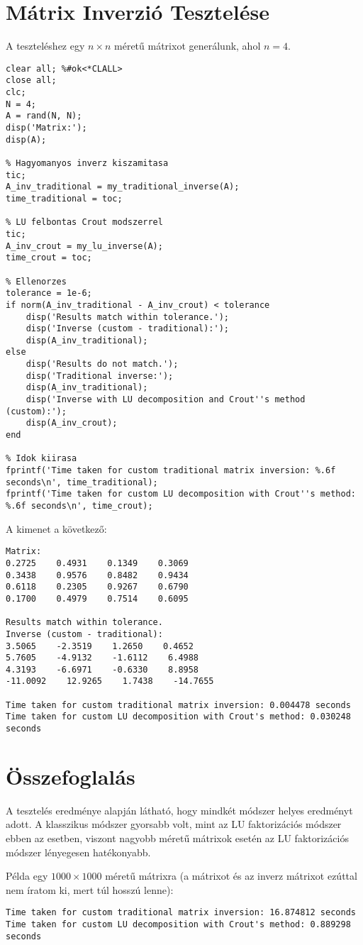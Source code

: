 \documentclass{article}
\begin{document}
\section{Mátrix Inverzió Tesztelése}
A teszteléshez egy $n \times n$ méretű mátrixot generálunk, ahol $n = 4$.
\begin{lstlisting}[style=mystyle]
clear all; %#ok<*CLALL>
close all;
clc;
N = 4;
A = rand(N, N);
disp('Matrix:');
disp(A);

% Hagyomanyos inverz kiszamitasa
tic;
A_inv_traditional = my_traditional_inverse(A);
time_traditional = toc;

% LU felbontas Crout modszerrel
tic;
A_inv_crout = my_lu_inverse(A);
time_crout = toc;

% Ellenorzes
tolerance = 1e-6;
if norm(A_inv_traditional - A_inv_crout) < tolerance
    disp('Results match within tolerance.');
    disp('Inverse (custom - traditional):');
    disp(A_inv_traditional);
else
    disp('Results do not match.');
    disp('Traditional inverse:');
    disp(A_inv_traditional);
    disp('Inverse with LU decomposition and Crout''s method (custom):');
    disp(A_inv_crout);
end

% Idok kiirasa
fprintf('Time taken for custom traditional matrix inversion: %.6f seconds\n', time_traditional);
fprintf('Time taken for custom LU decomposition with Crout''s method: %.6f seconds\n', time_crout);
\end{lstlisting}
A kimenet a következő:

\begin{lstlisting}[style=mystyle]
Matrix:
0.2725    0.4931    0.1349    0.3069
0.3438    0.9576    0.8482    0.9434
0.6118    0.2305    0.9267    0.6790
0.1700    0.4979    0.7514    0.6095

Results match within tolerance. 
Inverse (custom - traditional): 
3.5065    -2.3519    1.2650    0.4652 
5.7605    -4.9132    -1.6112    6.4988
4.3193    -6.6971    -0.6330    8.8958
-11.0092    12.9265    1.7438    -14.7655

Time taken for custom traditional matrix inversion: 0.004478 seconds
Time taken for custom LU decomposition with Crout's method: 0.030248 seconds
\end{lstlisting}

\section{Összefoglalás}
A tesztelés eredménye alapján látható, hogy mindkét módszer helyes eredményt
adott. A klasszikus módszer gyorsabb volt, mint az LU faktorizációs módszer
ebben az esetben, viszont nagyobb méretű mátrixok esetén az LU faktorizációs
módszer lényegesen hatékonyabb.

Példa egy $1000 \times 1000$ méretű mátrixra (a mátrixot és az inverz mátrixot
ezúttal nem íratom ki, mert túl hosszú lenne):
\begin{lstlisting}[style=mystyle]
Time taken for custom traditional matrix inversion: 16.874812 seconds
Time taken for custom LU decomposition with Crout's method: 0.889298 seconds
\end{lstlisting}
\end{document}
